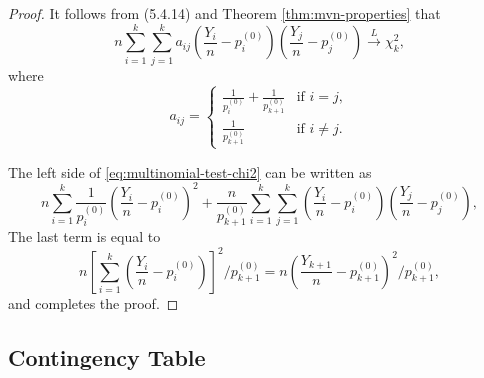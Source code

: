\begin{proof}
	It follows from (5.4.14) and Theorem \ref{thm:mvn-properties} that
\begin{equation}
	\label{eq:multinomial-test-chi2}
	n\sum_{i=1}^{k}\sum_{j=1}^{k}a_{ij}\left(\frac{Y_i}{n}-p_i^{(0)}\right)\left(\frac{Y_j}{n}-p_j^{(0)}\right)\xrightarrow{L}\chi_k^2,
	\end{equation}
	where
	\begin{equation*}
		a_{ij}=\begin{cases}
			\frac{1}{p_{i}^{(0)}}+\frac{1}{p_{k+1}^{(0)}} & \text{if }i=j,\\
			\frac{1}{p_{k+1}^{(0)}} & \text{if }i\neq j.
		\end{cases}
	\end{equation*}

	The left side of \eqref{eq:multinomial-test-chi2} can be written as
	\begin{equation*}
		n\sum_{i=1}^{k}\frac{1}{p_i^{(0)}}\left(\frac{Y_i}{n}-p_i^{(0)}\right)^2+\frac{n}{p_{k+1}^{(0)}}\sum_{i=1}^{k}\sum_{j=1}^k\left(\frac{Y_i}{n}-p_i^{(0)}\right)\left(\frac{Y_j}{n}-p_j^{(0)}\right),
	\end{equation*}
	The last term is equal to
	\begin{equation*}
	n\left[\sum_{i=1}^k\left(\frac{Y_i}{n}-p_i^{(0)}\right)\right]^2/p_{k+1}^{(0)}=n\left(\frac{Y_{k+1}}{n}-p_{k+1}^{(0)}\right)^2/p_{k+1}^{(0)},
	\end{equation*}
	and completes the proof.
\end{proof}

\subsection{Contingency Table}

